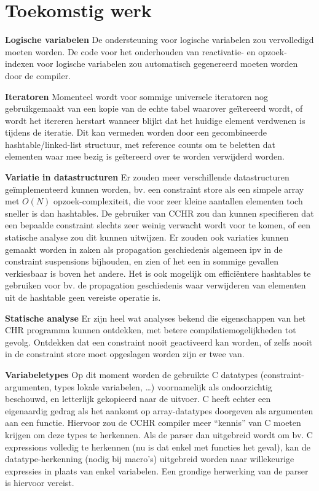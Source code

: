 \section{Toekomstig werk}

{\bf Logische variabelen} De ondersteuning voor logische variabelen zou vervolledigd moeten worden. De code voor het onderhouden van reactivatie- en opzoek-indexen voor logische variabelen zou automatisch gegenereerd moeten worden door de compiler.

{\bf Iteratoren} Momenteel wordt voor sommige universele iteratoren nog gebruikgemaakt van een kopie van de echte tabel waarover ge\"itereerd wordt, of wordt het itereren herstart wanneer blijkt dat het huidige element verdwenen is tijdens de iteratie. Dit kan vermeden worden door een gecombineerde hashtable/linked-list structuur, met reference counts om te beletten dat elementen waar mee bezig is ge\"itereerd over te worden verwijderd worden. 

{\bf Variatie in datastructuren} Er zouden meer verschillende datastructuren ge\"implementeerd kunnen worden, bv. een constraint store als een simpele array met $O(N)$ opzoek-complexiteit, die voor zeer kleine aantallen elementen toch sneller is dan hashtables. De gebruiker van CCHR zou dan kunnen specifieren dat een bepaalde constraint slechts zeer weinig verwacht wordt voor te komen, of een statische analyse zou dit kunnen uitwijzen. Er zouden ook variaties kunnen gemaakt worden in zaken als propagation geschiedenis algemeen ipv in de constraint suspensions bijhouden, en zien of het een in sommige gevallen verkiesbaar is boven het andere. Het is ook mogelijk om effici\"entere hashtables te gebruiken voor bv. de propagation geschiedenis waar verwijderen van elementen uit de hashtable geen vereiste operatie is.

{\bf Statische analyse} Er zijn heel wat analyses bekend die eigenschappen van het CHR programma kunnen ontdekken, met betere compilatiemogelijkheden tot gevolg. Ontdekken dat een constraint nooit geactiveerd kan worden, of zelfs nooit in de constraint store moet opgeslagen worden zijn er twee van.

{\bf Variabeletypes} Op dit moment worden de gebruikte C datatypes (constraint-argumenten, types lokale variabelen, \ldots) voornamelijk als ondoorzichtig beschouwd, en letterlijk gekopieerd naar de uitvoer. C heeft echter een eigenaardig gedrag als het aankomt op array-datatypes doorgeven als argumenten aan een functie. Hiervoor zou de CCHR compiler meer ``kennis'' van C moeten krijgen om deze types te herkennen. Als de parser dan uitgebreid wordt om bv. C expressions volledig te herkennen (nu is dat enkel met functies het geval), kan de datatype-herkenning (nodig bij macro's) uitgebreid worden naar willekeurige expressies in plaats van enkel variabelen. Een grondige herwerking van de parser is hiervoor vereist.

